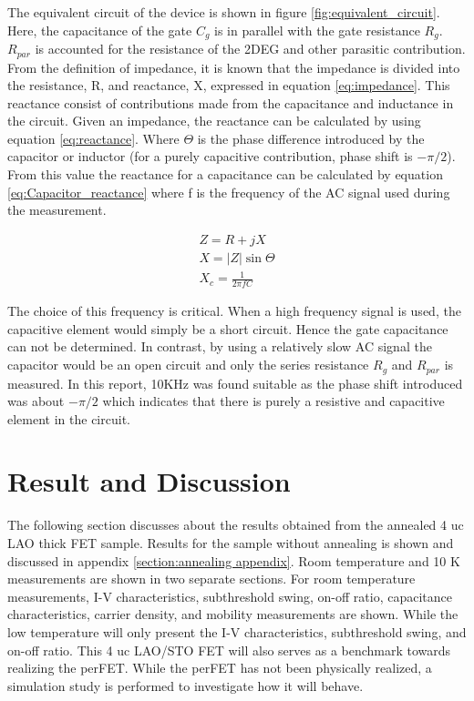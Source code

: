 \documentclass[11pt,a4paper]{report}
\begin{document}
The equivalent circuit of the device is shown in figure \ref{fig:equivalent_circuit}. Here, the capacitance of the gate $C_g$ is in parallel with the gate resistance $R_g$. $R_{par}$ is accounted for the resistance of the 2DEG and other parasitic contribution. From the definition of impedance, it is known that the impedance is divided into the resistance, R, and reactance, X, expressed in equation \ref{eq:impedance}. This reactance consist of contributions made from the capacitance and inductance in the circuit. Given an impedance, the reactance can be calculated by using equation \ref{eq:reactance}. Where $\Theta$ is the phase difference introduced by the capacitor or inductor (for a purely capacitive contribution, phase shift is $-\pi/2$). From this value the reactance for a capacitance can be calculated by equation \ref{eq:Capacitor_reactance} where f is the frequency of the AC signal used during the measurement.

\begin{align}
    Z = R + jX \label{eq:impedance}\\ 
    X = |Z|\sin{\Theta}  \label{eq:reactance}\\
    X_c = \frac{1}{2\pi f C} \label{eq:Capacitor_reactance}
\end{align}

The choice of this frequency is critical. When a high frequency signal is used, the capacitive element would simply be a short circuit. Hence the gate capacitance can not be determined. In contrast, by using a relatively slow AC signal the capacitor would be an open circuit and only the series resistance $R_g$ and $R_{par}$ is measured. In this report, 10KHz was found suitable as the phase shift introduced was about  $-\pi/2$ which indicates that there is purely a resistive and capacitive element in the circuit.




\chapter{Result and Discussion}
The following section discusses about the results obtained from the annealed 4 uc LAO thick FET sample. Results for the sample without annealing is shown and discussed in appendix \ref{section:annealing appendix}. Room temperature and 10 K measurements are shown in two separate sections. For room temperature measurements, I-V characteristics, subthreshold swing, on-off ratio, capacitance characteristics, carrier density, and mobility measurements are shown. While the low temperature will only present the I-V characteristics, subthreshold swing, and on-off ratio. This 4 uc LAO/STO FET will also serves as a benchmark towards realizing the perFET. While the perFET has not been physically realized, a simulation study is performed to investigate how it will behave.
\end{document}

